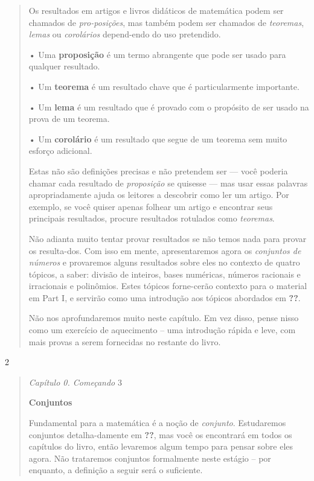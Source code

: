 \documentclass[
]{article}
\begin{document}
\begin{quote}
Os resultados em artigos e livros didáticos de matemática podem ser
chamados de \emph{pro-posições}, mas também podem ser chamados de
\emph{teoremas}, \emph{lemas} ou \emph{corolários} depend-endo do uso
pretendido.

• Uma \textbf{proposição} é um termo abrangente que pode ser usado para
qualquer resultado.

• Um \textbf{teorema} é um resultado chave que é particularmente
importante.

• Um \textbf{lema} é um resultado que é provado com o propósito de ser
usado na prova de um teorema.

• Um \textbf{corolário} é um resultado que segue de um teorema sem muito
esforço adicional.

Estas não são definições precisas e não pretendem ser --- você poderia
chamar cada resultado de \emph{proposição} se quisesse --- mas usar
essas palavras apropriadamente ajuda os leitores a descobrir como ler um
artigo. Por exemplo, se você quiser apenas folhear um artigo e encontrar
seus principais resultados, procure resultados rotulados como
\emph{teoremas}.

Não adianta muito tentar provar resultados se não temos nada para provar
os resulta-dos. Com isso em mente, apresentaremos agora os
\emph{conjuntos de números} e provaremos alguns resultados sobre eles no
contexto de quatro tópicos, a saber: divisão de inteiros, bases
numéricas, números racionais e irracionais e polinômios. Estes tópicos
forne-cerão contexto para o material em Part I, e servirão como uma
introdução aos tópicos abordados em \textbf{??}.

Não nos aprofundaremos muito neste capítulo. Em vez disso, pense nisso
como um exercício de aquecimento -- uma introdução rápida e leve, com
mais provas a serem fornecidas no restante do livro.
\end{quote}

2

\begin{quote}
\emph{Capítulo 0. Começando} 3

\textbf{Conjuntos}

Fundamental para a matemática é a noção de \emph{conjunto}. Estudaremos
conjuntos detalha-damente em \textbf{??}, mas você os encontrará em
todos os capítulos do livro, então levaremos algum tempo para pensar
sobre eles agora. Não trataremos conjuntos formalmente neste estágio --
por enquanto, a definição a seguir será o suficiente.
\end{quote}
\end{document}
